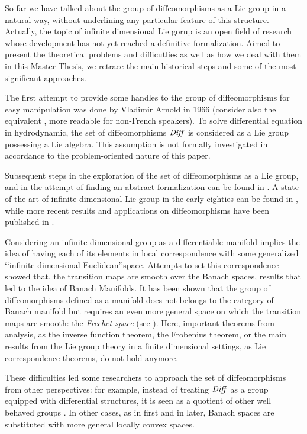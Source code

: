 So far we have talked about the group of diffeomorphisms as a Lie group in a natural way, without underlining any particular feature of this structure. Actually, the topic of infinite dimensional Lie gorup is an open field of research whose development has not yet reached a definitive formalization.
Aimed to present the theoretical problems and difficutlies as well as how we deal with them in this Master Thesis, we retrace the main historical steps and some of the most significant approaches.

The first attempt to provide some handles to the group of diffeomorphisms for easy manipulation was done by Vladimir Arnold in 1966 \cite{arnold1966geometrie} (consider also the equivalent \cite{arnold1998topological}, more readable for non-French speakers). To solve differential equation in hydrodynamic, the set of diffeomorphisms $\text{\emph{Diff}}$ is considered as a Lie group possessing a Lie algebra. This assumption is not formally investigated in accordance to the problem-oriented nature of this paper. 

Subsequent steps in the exploration of the set of diffeomorphisms as a Lie group, and in the attempt of finding an abstract formalization can be found in \cite{marsden1970hamiltonian, ebin1970groups, omori1970group, michor1980manifolds, leslie1983lie}. A state of the art of  infinite dimensional Lie group in the early eighties can be found in \cite{Milnor:84:remarks}, while more recent results and applications on diffeomorphisms have been published in \cite{ovsienko1992integrals, bauer2010sobolev, schmid2010infinite,  bauer2011geodesic}.

Considering an infinite dimensional group as a differentiable manifold implies the idea of having each of its elements in local correspondence with some generalized \lq\lq infinite-dimensional Euclidean\rq\rq\phantom{z}space. Attempts to set this correspondence showed that, the transition maps are smooth over the Banach spaces, results that led to the idea of Banach Manifolds. It has been shown that the group of diffeomorphisms defined as a manifold does not belongs to the category of Banach manifold but requires an even more general space on which the transition maps are smooth: the \emph{Frechet space} (see \cite{khesin2008geometry}). Here, important theorems from analysis, as the inverse function theorem, the Frobenius theorem, or the main results from the Lie group theory in a finite dimensional settings, as Lie correspondence theorems, do not hold anymore. 

These difficulties led some researchers to approach the set of diffeomorphisms from other perspectives: 
for example, instead of treating $\text{\emph{Diff}}$ as a group equipped with differential structures, it is seen as a quotient of other well behaved groups \cite{wojtynski1994one}. In other cases, as in \cite{marsden1970hamiltonian} first and in \cite{milnor1984remarks} later, Banach spaces are substituted with more general locally convex spaces.

